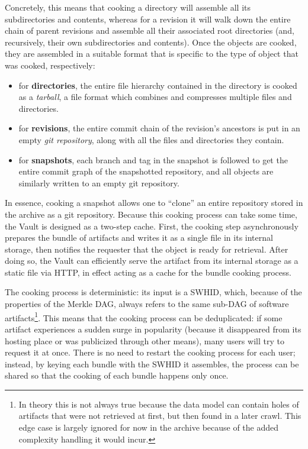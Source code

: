 Concretely, this means that cooking a directory will assemble all its
subdirectories and contents, whereas for a revision it will walk down the
entire chain of parent revisions and assemble all their associated root
directories (and, recursively, their own subdirectories and contents).
Once the objects are cooked, they are assembled in a suitable format that is
specific to the type of object that was cooked, respectively:

\begin{itemize}
    \item for \textbf{directories}, the entire file hierarchy contained in the
        directory is cooked as a \emph{tarball}, a file format which combines
        and compresses multiple files and directories.
    \item for \textbf{revisions}, the entire commit chain of the revision's
        ancestors is put in an empty \emph{git repository}, along with all the
        files and directories they contain.
    \item for \textbf{snapshots}, each branch and tag in the snapshot is
        followed to get the entire commit graph of the snapshotted repository,
        and all objects are similarly written to an empty git repository.
\end{itemize}

In essence, cooking a snapshot allows one to ``clone'' an entire repository
stored in the archive as a git repository. Because this cooking process can
take some time, the Vault is designed as a two-step cache. First, the cooking
step asynchronously prepares the bundle of artifacts and writes it as a single
file in its internal storage, then notifies the requester that the object is
ready for retrieval. After doing so, the Vault can efficiently serve the
artifact from its internal storage as a static file via HTTP, in effect acting
as a cache for the bundle cooking process.

The cooking process is deterministic: its input is a \gls{SWHID}, which,
because of the properties of the Merkle DAG, always refers to the same sub-DAG
of software artifacts\footnote{In theory this is not always true because the
data model can contain holes of artifacts that were not retrieved at first,
but then found in a later crawl. This edge case is largely ignored for now in
the archive because of the added complexity handling it would incur.}. This
means that the cooking process can be deduplicated: if some artifact
experiences a sudden surge in popularity (because it disappeared from its
hosting place or was publicized through other means), many users will try
to request it at once. There is no need to restart the cooking process for
each user; instead, by keying each bundle with the \gls{SWHID} it
assembles, the process can be shared so that the cooking of each bundle
happens only once.

